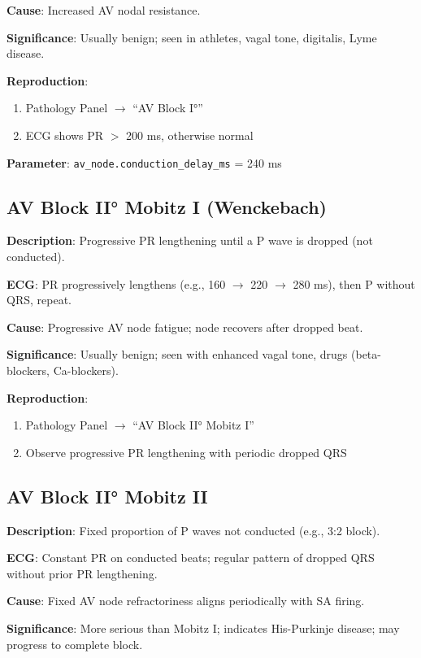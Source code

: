 \documentclass[12pt,oneside,a4paper]{book}
\newcommand{\code}[1]{\texttt{#1}}
\begin{document}
\textbf{Cause}: Increased AV nodal resistance.

\textbf{Significance}: Usually benign; seen in athletes, vagal tone, digitalis, Lyme disease.

\textbf{Reproduction}:
\begin{enumerate}
  \item Pathology Panel $\to$ ``AV Block I°''
  \item ECG shows PR $>$ 200 ms, otherwise normal
\end{enumerate}

\textbf{Parameter}: \code{av\_node.conduction\_delay\_ms} = 240 ms

\subsection{AV Block II° Mobitz I (Wenckebach)}

\textbf{Description}: Progressive PR lengthening until a P wave is dropped (not conducted).

\textbf{ECG}: PR progressively lengthens (e.g., 160 $\to$ 220 $\to$ 280 ms), then P without QRS, repeat.

\textbf{Cause}: Progressive AV node fatigue; node recovers after dropped beat.

\textbf{Significance}: Usually benign; seen with enhanced vagal tone, drugs (beta-blockers, Ca-blockers).

\textbf{Reproduction}:
\begin{enumerate}
  \item Pathology Panel $\to$ ``AV Block II° Mobitz I''
  \item Observe progressive PR lengthening with periodic dropped QRS
\end{enumerate}

\subsection{AV Block II° Mobitz II}

\textbf{Description}: Fixed proportion of P waves not conducted (e.g., 3:2 block).

\textbf{ECG}: Constant PR on conducted beats; regular pattern of dropped QRS without prior PR lengthening.

\textbf{Cause}: Fixed AV node refractoriness aligns periodically with SA firing.

\textbf{Significance}: More serious than Mobitz I; indicates His-Purkinje disease; may progress to complete block.
\end{document}
